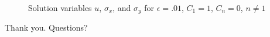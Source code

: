 \documentclass[mathserif]{beamer}
\begin{document}
{\begin{figure}
{}
\caption{Solution variables $u$, $\sigma_x$, and $\sigma_y$ for $\epsilon = .01$, $C_1 = 1$, $C_n=0$, $n\neq 1$}
\end{figure}
}








\begin{frame}
\begin{center}
  \vfill
  Thank you.
  \vfill
  Questions?
  \vfill
\end{center}
\end{frame}
\end{document}
